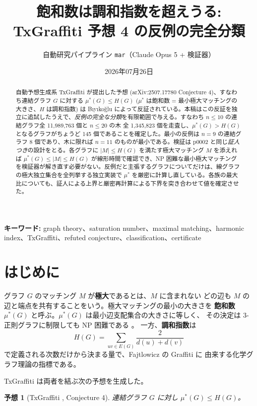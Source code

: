 \documentclass[paper=a4,fontsize=10.5pt,jafontsize=10.5pt]{jlreq}
\title{飽和数は調和指数を超えうる: TxGraffiti 予想 4 の反例の完全分類}
\author{自動研究パイプライン \texttt{mar}（Claude Opus 5 + 検証器）}
\date{2026年07月26日}
\theoremstyle{plain}
\newtheorem{conjecture}[theorem]{予想}
\theoremstyle{definition}
\begin{document}
\maketitle

\begin{abstract}
自動予想生成系 TxGraffiti が提出した予想 (arXiv:2507.17780 Conjecture 4)、すなわち連結グラフ $G$ に対する $\mu^*(G) \le H(G)$ ($\mu^*$ は飽和数 = 最小極大マッチングの大きさ、$H$ は調和指数) は Bıyıkoğlu によって反証されている。本稿はこの反証を独立に追試したうえで、\emph{反例の完全な分類}を有限範囲で与える。すなわち $n \le 10$ の連結グラフ全 11,989,763 個と $n \le 20$ の木 全 1,345,823 個を走査し、$\mu^*(G) > H(G)$ となるグラフがちょうど 145 個であることを確定した。最小の反例は $n = 9$ の連結グラフ 8 個であり、木に限れば $n = 11$ のものが最小である。検証は p0002 と同じ\emph{証人つき}の設計をとる。各グラフに $|M| \le H(G)$ を満たす極大マッチング $M$ を添えれば $\mu^*(G) \le |M| \le H(G)$ が線形時間で確認でき、NP 困難な最小極大マッチングを検証器が解き直す必要がない。反例だと主張するグラフについてだけは、線グラフの極大独立集合を全列挙する独立実装で $\mu^*$ を厳密に計算し直している。各族の最大比についても、証人による上界と厳密再計算による下界を突き合わせて値を確定させた。
\end{abstract}

\noindent\textbf{キーワード:} graph theory、saturation number、maximal matching、harmonic index、TxGraffiti、refuted conjecture、classification、certificate


\section{はじめに}

グラフ $G$ のマッチング $M$ が\textbf{極大}であるとは、$M$ に含まれない
どの辺も $M$ の辺と端点を共有することをいう。極大マッチングの最小の大きさを
\textbf{飽和数} $\mu^*(G)$ と呼ぶ。$\mu^*(G)$ は最小辺支配集合の大きさに等しく、
その決定は 3-正則グラフに制限しても NP 困難である \cite{yannakakis}。
一方、\textbf{調和指数}は
\[ H(G) = \sum_{uv \in E(G)} \frac{2}{d(u) + d(v)} \]
で定義される次数だけから決まる量で、Fajtlowicz の Graffiti \cite{fajtlowicz} に
由来する化学グラフ理論の指標である。

TxGraffiti \cite{reverie} は両者を結ぶ次の予想を生成した。

\begin{conjecture}[TxGraffiti \cite{reverie}, Conjecture 4]
\label{conj:main}
連結グラフ $G$ に対し $\mu^*(G) \le H(G)$。
\end{conjecture}
\end{document}
